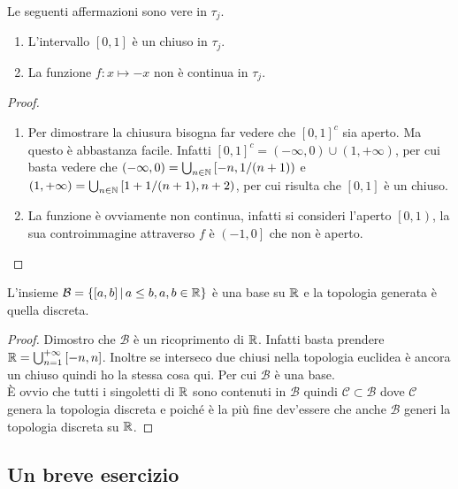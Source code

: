\begin{theorem}
	Le seguenti affermazioni sono vere in $\tau_j$.
	\begin{enumerate}
		\item L'intervallo $\left[0,1\right]$ è un chiuso in $\tau_j$. 
		\item La funzione $f \colon x \mapsto -x$ non è continua in $\tau_j$.
	\end{enumerate}
\end{theorem}
\begin{proof}\
	\begin{enumerate}
		\item Per dimostrare la chiusura bisogna far vedere che $\left[0,1\right]^c$ sia aperto. Ma questo è abbastanza facile. Infatti $\left[0,1\right]^c = \left(-\infty, 0\right) \cup \left(1, +\infty\right)$, per cui basta vedere che $\left(-\infty, 0\right) = \bigcup_{n \in \mathbb{N}} \left[-n, 1/(n+1)\right)$ e $\left(1, +\infty\right) = \bigcup_{n \in \mathbb{N}} \left[1+1/(n+1), n+2\right)$, per cui risulta che $\left[0,1\right]$ è un chiuso.
		\item La funzione è ovviamente non continua, infatti si consideri l'aperto $\left[0,1\right)$, la sua controimmagine attraverso $f$ è $\left(-1, 0\right]$ che non è aperto.
	\end{enumerate}
\end{proof}

\begin{theorem}
	L'insieme $\mathcal{B} = \left\{ \left[a, b\right] \,\middle|\, a \le b, a, b \in \mathbb{R} \right\}$ è una base su $\mathbb{R}$ e la topologia generata è quella discreta. 
\end{theorem}
\begin{proof}
	Dimostro che $\mathcal{B}$ è un ricoprimento di $\mathbb{R}$. Infatti basta prendere $\mathbb{R} = \bigcup^{+\infty}_{n=1} \left[-n, n\right]$. Inoltre se interseco due chiusi nella topologia euclidea è ancora un chiuso quindi ho la stessa cosa qui. Per cui $\mathcal{B}$ è una base. \\ 
	
	È ovvio che tutti i singoletti di $\mathbb{R}$ sono contenuti in $\mathcal{B}$ quindi $\mathcal{C}\subset \mathcal{B}$ dove $\mathcal{C}$ genera la topologia discreta e poiché è la più fine dev'essere che anche $\mathcal{B}$ generi la topologia discreta su $\mathbb{R}$.
\end{proof}



\subsection{\textcolor{TopGener}{\textbf{Un breve esercizio}}}



